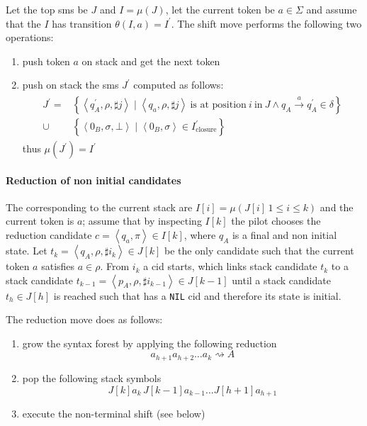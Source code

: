 \documentclass[english]{article}
\begin{document}
Let the top sms be \(J\) and \(I = \mu(J)\), let the current token be \(a \in \Sigma\) and assume that the \mstate \(I\) has transition \(\theta(I, a) = I^\prime\). The shift move performs the following two operations:
\begin{enumerate}[label=\arabic*., ref=(\arabic*)]
\item\label{enum:shift-move-1} push token \(a\) on stack and get the next token
\item\label{enum:shift-move-2} push on stack the sms \(J^\prime\) computed as follows:
\begin{gather*}
  \begin{aligned}
    J^\prime  = & \left\{ \left\langle q_A^\prime, \rho, \sharp j \right\rangle \mid \left\langle q_a, \rho, \sharp j \right\rangle \ \text{is at position} \ i \ \text{in} \ J \land q_A \xrightarrow{a} q_A^\prime \in \delta \right\} \\
              \cup & \left\{ \left\langle 0_B, \sigma, \bot \right\rangle \mid \left\langle 0_B, \sigma  \right\rangle \in I_{\text{closure}}^\prime \right\}
  \end{aligned}
\end{gather*}
thus \(\mu(J^\prime) = I^\prime\)
\end{enumerate}

\paragraph*{Reduction of non initial candidates}
The \mstates corresponding to the current stack are  \(I[i] = \mu\left( J[i] \, 1 \leq i \leq k \right)\) and the current token is \(a\);
assume that by inspecting \(I[k]\) the pilot chooses the reduction candidate \(c = \left\langle q_a, \pi \right\rangle \in I[k]\), where \(q_A\) is a final and non initial state.
Let \(t_k = \left\langle q_A, \rho, \sharp i_k \right\rangle \in J[k]\) be the only candidate such that the current token \(a\) satisfies \(a \in \rho\).
From \(i_k\) a cid starts, which links stack candidate \(t_k\) to a stack candidate \(t_{k-1} = \left\langle p_A, \rho, \sharp i_{k-1} \right\rangle \in J[k-1]\) until a stack candidate \(t_h \in J[h]\) is reached such that has a \texttt{NIL} cid and therefore its state is initial.

The reduction move does as follows:

\begin{enumerate}
  \item grow the syntax forest by applying the following reduction
  \[ a_{h+1} a_{h+2} \ldots a_k \rightsquigarrow A \]
  \item pop the following stack symbols
  \[ J[k] a_k \, J[k-1] a_{k-1} \ldots J[h+1] a_{h+1} \]
  \item execute the non-terminal shift (see below)
\end{enumerate}
\end{document}
